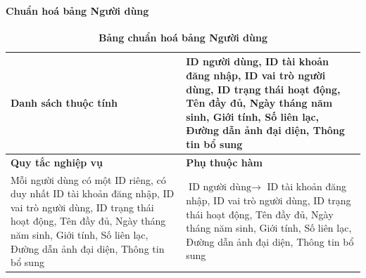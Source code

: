 \paragraph{Chuẩn hoá bảng Người dùng}
\mbox{}
\begin{table}[H]
	\caption{\bfseries \fontsize{12pt}{0pt}\selectfont Bảng chuẩn hoá bảng Người dùng}
	\centering
	\begin{tabularx}{0.9\textwidth}{|X|X|}
		\hline
		\textbf{Danh sách thuộc tính}                                                                                                                                                                                          & ID người dùng, ID tài khoản đăng nhập, ID vai trò người dùng, ID trạng thái hoạt động, Tên đầy đủ, Ngày tháng năm sinh, Giới tính, Số liên lạc, Đường dẫn ảnh đại diện, Thông tin bổ sung                                             \\
		\hline
		\textbf{Quy tắc nghiệp vụ}                                                                                                                                                                                             & \textbf{Phụ thuộc hàm}                                                                                                                                                                                                                \\
		\hline
		Mỗi người dùng có một ID riêng, có duy nhất ID tài khoản đăng nhập, ID vai trò người dùng, ID trạng thái hoạt động, Tên đầy đủ, Ngày tháng năm sinh, Giới tính, Số liên lạc, Đường dẫn ảnh đại diện, Thông tin bổ sung & \parbox[t]{\linewidth}{$\text{ID người dùng} \rightarrow$ ID tài khoản đăng nhập, ID vai trò người dùng, ID trạng thái hoạt động, Tên đầy đủ, Ngày tháng năm sinh, Giới tính, Số liên lạc, Đường dẫn ảnh đại diện, Thông tin bổ sung} \\
		\hline
		                                                                                                                                                                                                                                                                                                                                                                                  \\
		                                                                                                                                                                                                                                                                                                                                                                                            \\
		\hline
	\end{tabularx}
\end{table}

